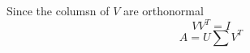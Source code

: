 \markdownRendererInterblockSeparator
{}Since the columsn of $V$ are orthonormal\markdownRendererEllipsis{}\markdownRendererInterblockSeparator
{}$$VV^T=I$$\markdownRendererInterblockSeparator
{}$$A = U\sum V^T$$\relax